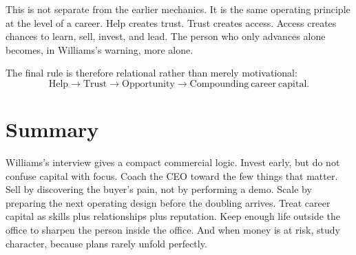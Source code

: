 This is not separate from the earlier mechanics. It is the same operating principle at the level of a career. Help creates trust. Trust creates access. Access creates chances to learn, sell, invest, and lead. The person who only advances alone becomes, in Williams's warning, more alone.

The final rule is therefore relational rather than merely motivational:
\begin{equation}
\mathrm{Help}
\longrightarrow
\mathrm{Trust}
\longrightarrow
\mathrm{Opportunity}
\longrightarrow
\mathrm{Compounding\ career\ capital}.
\end{equation}

\section{Summary}

Williams's interview gives a compact commercial logic. Invest early, but do not confuse capital with focus. Coach the CEO toward the few things that matter. Sell by discovering the buyer's pain, not by performing a demo. Scale by preparing the next operating design before the doubling arrives. Treat career capital as skills plus relationships plus reputation. Keep enough life outside the office to sharpen the person inside the office. And when money is at risk, study character, because plans rarely unfold perfectly.